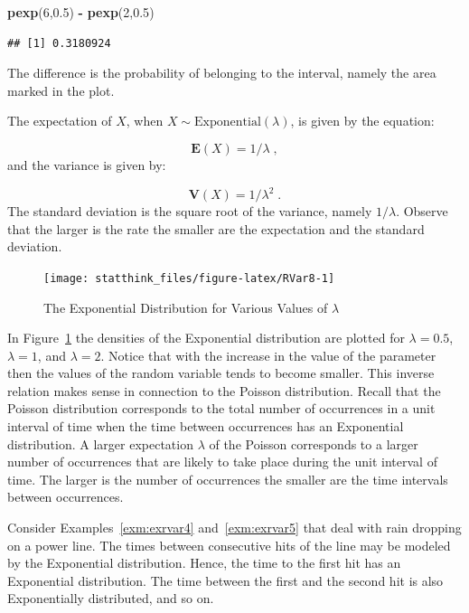\documentclass[
]{krantz}
\makeatletter
\newenvironment{Shaded}{\begin{snugshade}}{\end{snugshade}}
\newcommand{\DecValTok}[1]{\textcolor[rgb]{0.00,0.00,0.81}{#1}}
\newcommand{\FloatTok}[1]{\textcolor[rgb]{0.00,0.00,0.81}{#1}}
\newcommand{\KeywordTok}[1]{\textcolor[rgb]{0.13,0.29,0.53}{\textbf{#1}}}
\newcommand{\NormalTok}[1]{#1}
\newcommand{\OperatorTok}[1]{\textcolor[rgb]{0.81,0.36,0.00}{\textbf{#1}}}
\newcommand{\StringTok}[1]{\textcolor[rgb]{0.31,0.60,0.02}{#1}}
\newcommand{\Expec}{\mathbf{E}}
\newcommand{\Var}{\mathbf{V}}
\newenvironment{kframe}{%
\medskip{}
\setlength{\fboxsep}{.8em}
 \def\at@end@of@kframe{}%
 \ifinner\ifhmode%
  \def\at@end@of@kframe{\end{minipage}}%
  \begin{minipage}{\columnwidth}%
 \fi\fi%
 \def\FrameCommand##1{\hskip\@totalleftmargin \hskip-\fboxsep
 \colorbox{shadecolor}{##1}\hskip-\fboxsep
     \hskip-\linewidth \hskip-\@totalleftmargin \hskip\columnwidth}%
 \MakeFramed {\advance\hsize-\width
   \@totalleftmargin\z@ \linewidth\hsize
   \@setminipage}}%
 {\par\unskip\endMakeFramed%
 \at@end@of@kframe}
\renewenvironment{Shaded}{\begin{kframe}}{\end{kframe}}
\theoremstyle{definition}
\theoremstyle{definition}
\theoremstyle{definition}
\theoremstyle{remark}
\let\BeginKnitrBlock\begin \let\EndKnitrBlock\end
\makeatother
\begin{document}
\begin{Shaded}
\begin{Highlighting}[]
\KeywordTok{pexp}\NormalTok{(}\DecValTok{6}\NormalTok{,}\FloatTok{0.5}\NormalTok{) }\OperatorTok{-}\StringTok{ }\KeywordTok{pexp}\NormalTok{(}\DecValTok{2}\NormalTok{,}\FloatTok{0.5}\NormalTok{)}
\end{Highlighting}
\end{Shaded}

\begin{verbatim}
## [1] 0.3180924
\end{verbatim}

The difference is the probability of belonging to the interval, namely
the area marked in the plot.

The expectation of \(X\), when \(X \sim \mathrm{Exponential}(\lambda)\), is
given by the equation:

\[\Expec(X) = 1/\lambda\;,\] and the variance is
given by:

\[\Var(X) =1/\lambda^2\;.\] The standard deviation is the
square root of the variance, namely \(1/\lambda\). Observe that the larger
is the rate the smaller are the expectation and the standard deviation.

\begin{figure}

{\centering \texttt{[image: statthink\_files/figure-latex/RVar8-1]} 

}

\caption{The Exponential Distribution for Various Values of $\lambda$}\label{fig:RVar8}
\end{figure}

In Figure~\ref{fig:RVar8} the densities of the Exponential
distribution are plotted for \(\lambda = 0.5\), \(\lambda = 1\), and
\(\lambda = 2\). Notice that with the increase in the value of the
parameter then the values of the random variable tends to become
smaller. This inverse relation makes sense in connection to the Poisson
distribution. Recall that the Poisson distribution corresponds to the
total number of occurrences in a unit interval of time when the time
between occurrences has an Exponential distribution. A larger
expectation \(\lambda\) of the Poisson corresponds to a larger number of
occurrences that are likely to take place during the unit interval of
time. The larger is the number of occurrences the smaller are the time
intervals between occurrences.

\BeginKnitrBlock{example}
\protect\hypertarget{exm:exrvar7}{}{\label{exm:exrvar7} }Consider Examples~\ref{exm:exrvar4}
and~\ref{exm:exrvar5} that deal with rain dropping on a power line.
The times between consecutive hits of the line may be modeled by the
Exponential distribution. Hence, the time to the first hit has an
Exponential distribution. The time between the first and the second hit
is also Exponentially distributed, and so on.
\EndKnitrBlock{example}
\end{document}
